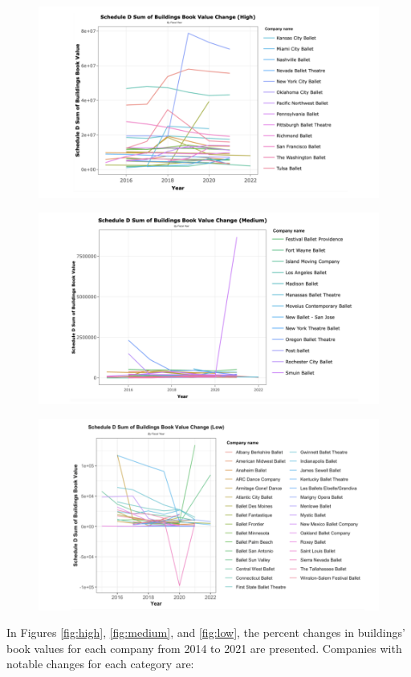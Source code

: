 \documentclass[Dance Data
Project,article,submit,moreauthors,pdftex]{mdpi}
\begin{document}
\begin{figure}[H]
\includegraphics[width=0.8\linewidth,]{../images/high} \caption{\label{fig:high}}\label{fig:unnamed-chunk-19}
\end{figure}

\begin{figure}[H]
\includegraphics[width=0.8\linewidth,]{../images/medium} \caption{\label{fig:medium}}\label{fig:unnamed-chunk-20}
\end{figure}

\begin{figure}[H]
\includegraphics[width=0.8\linewidth,]{../images/low} \caption{\label{fig:low}}\label{fig:unnamed-chunk-21}
\end{figure}

In Figures \ref{fig:high}, \ref{fig:medium}, and \ref{fig:low}, the
percent changes in buildings' book values for each company from 2014 to
2021 are presented. Companies with notable changes for each category
are:
\end{document}
